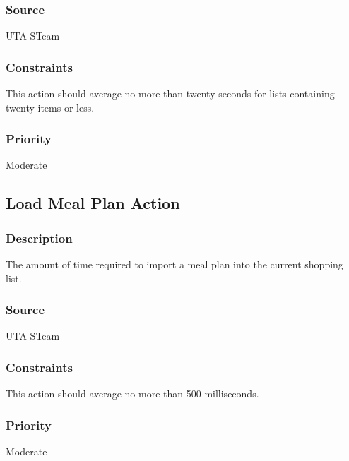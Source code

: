 \subsubsection{Source}
UTA STeam
\subsubsection{Constraints}
This action should average no more than twenty seconds for lists containing twenty items or less.
\subsubsection{Priority}
Moderate

\subsection{Load Meal Plan Action}
\subsubsection{Description}
The amount of time required to import a meal plan into the current shopping list.
\subsubsection{Source}
UTA STeam
\subsubsection{Constraints}
This action should average no more than 500 milliseconds.
\subsubsection{Priority}
Moderate